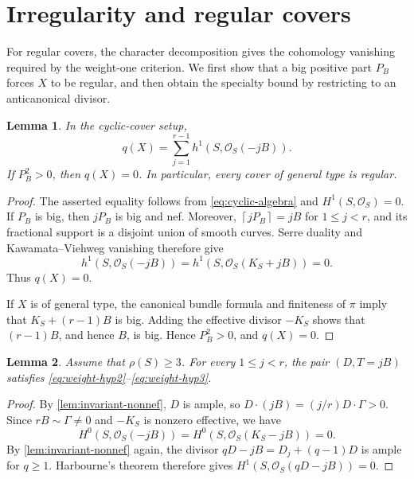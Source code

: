 \documentclass[11pt,reqno]{amsart}
\numberwithin{equation}{section}
\newtheorem{lemma}[lemma]{Lemma}
\theoremstyle{remark}
\newcommand{\sshf}[1]{\mathcal{O}_{#1}}
\newcommand{\ceil}[1]{\left\lceil #1\right\rceil}
\begin{document}
\section{Irregularity and regular covers}
\label{sec:regular}

For regular covers, the character decomposition gives the cohomology vanishing required by the weight-one criterion. We first show that a big positive part \(P_B\) forces \(X\) to be regular, and then obtain the specialty bound by restricting to an anticanonical divisor.

\begin{lemma}\label{lem:regularity}
In the cyclic-cover setup,
\begin{equation*}
 q(X)=\sum_{j=1}^{r-1}h^1(S,\sshf{S}(-jB)).
\end{equation*}
If \(P_B^2>0\), then \(q(X)=0\). In particular, every cover of
general type is regular.
\end{lemma}

\begin{proof}
The asserted equality follows from
\eqref{eq:cyclic-algebra} and \(H^1(S,\sshf{S})=0\).
If \(P_B\) is big, then \(jP_B\) is big and nef. Moreover,
\(\ceil{jP_B}=jB\) for \(1\leq j<r\), and its fractional support is a
disjoint union of smooth curves. Serre duality and Kawamata--Viehweg vanishing therefore give
\[
 h^1(S,\sshf{S}(-jB))=h^1(S,\sshf{S}(K_S+jB))=0.
\]
Thus \(q(X)=0\).

If \(X\) is of general type, the canonical bundle formula and
finiteness of \(\pi\) imply that \(K_S+(r-1)B\) is big. Adding the
effective divisor \(-K_S\) shows that \((r-1)B\), and hence \(B\),
is big. Hence \(P_B^2>0\), and $q(X)=0$.
\end{proof}

\begin{lemma}\label{lem:scalar-big}
Assume that \(\rho(S)\geq3\).
For every \(1\leq j<r\), the pair \((D,T=jB)\) satisfies
\eqref{eq:weight-hyp2}--\eqref{eq:weight-hyp3}.
\end{lemma}

\begin{proof}
By \cref{lem:invariant-nonnef}, $D$ is ample, so
\(D\cdot(jB)=(j/r)D\cdot\Gamma>0\).
Since \(rB\sim\Gamma\neq0\) and \(-K_S\) is nonzero effective,
we have
\[
 H^0(S,\sshf{S}(-jB))=H^0(S,\sshf{S}(K_S-jB))=0.
\]
By \cref{lem:invariant-nonnef} again, the divisor
\(qD-jB=D_j+(q-1)D\) is ample
for \(q\geq1\). Harbourne's theorem therefore gives
\(H^1(S,\sshf{S}(qD-jB))=0\).
\end{proof}
\end{document}
